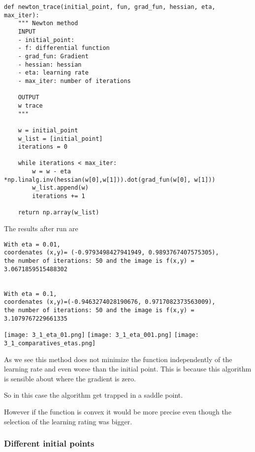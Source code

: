 \begin{verbatim}
def newton_trace(initial_point, fun, grad_fun, hessian, eta, max_iter):
    """ Newton method
    INPUT 
    - initial_point: 
    - f: differential function
    - grad_fun: Gradient
    - hessian: hessian
    - eta: learning rate
    - max_iter: number of iterations

    OUTPUT 
    w trace
    """

    w = initial_point
    w_list = [initial_point]
    iterations = 0

    while iterations < max_iter:
        w = w - eta *np.linalg.inv(hessian(w[0],w[1])).dot(grad_fun(w[0], w[1]))
        w_list.append(w)
        iterations += 1

    return np.array(w_list)

 \end{verbatim}


 The results after run are

 \begin{verbatim}
With eta = 0.01, 
coordenates (x,y)= (-0.9793498427941949, 0.9893767407575305), 
the number of iterations: 50 and the image is f(x,y) = 3.0671859515488302


With eta = 0.1, 
coordenates (x,y)=(-0.9463274028190676, 0.9717082373563009), 
the number of iterations: 50 and the image is f(x,y) = 3.1079767229661335
\end{verbatim}



 \texttt{[image: 3\_1\_eta\_01.png]}
 \texttt{[image: 3\_1\_eta\_001.png]}
 \texttt{[image: 3\_1\_comparatives\_etas.png]}


 As we see this method does not minimize the function independently of the learning rate and even worse than the initial point. This is because this algorithm is sensible about where the gradient is zero.

 So in this case the algorithm get trapped in a saddle point.

 However if the function is convex it would be more precise even though the selection of the learning rating was bigger. 





\subsubsection{Different initial points }

